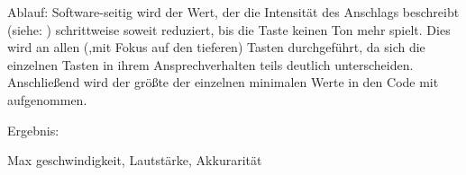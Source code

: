     Ablauf: Software-seitig wird der Wert, der die Intensität des Anschlags beschreibt (siehe: ) schrittweise soweit reduziert, bis die Taste keinen Ton mehr spielt.
    Dies wird an allen (,mit Fokus auf den tieferen) Tasten durchgeführt, da sich die einzelnen Tasten in ihrem Ansprechverhalten teils deutlich unterscheiden.
    Anschließend wird der größte der einzelnen minimalen Werte in den Code mit aufgenommen.

    Ergebnis:


    Max geschwindigkeit, Lautstärke, Akkurarität


